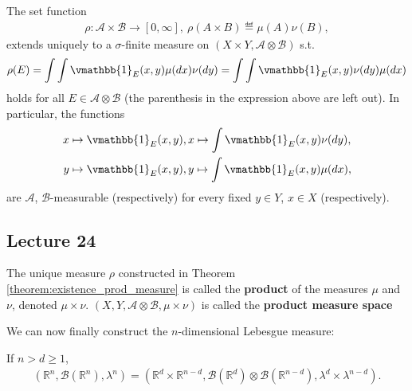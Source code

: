 \fi 
\begin{theorem}  \label{theorem:existence_prod_measure}
    The set function
    \begin{align*}
        \rho:\mathscr{A}\times \mathscr{B} \rightarrow [0,\infty], \ \rho(A\times B) \eqdef \mu(A)\nu(B),
    \end{align*}
    extends uniquely to a \(\sigma\)-finite measure on \((X\times Y, \mathscr{A}\otimes\mathscr{B})\) s.t.
    \begin{align*}
        \rho(E) = \int\int \vmathbb{1}_{E}(x,y) \mu(dx)\nu(dy) = \int\int \vmathbb{1}_{E}(x,y)\nu(dy)\mu(dx)
    \end{align*}
    holds for all \(E\in\mathscr{A}\otimes\mathscr{B}\) (the parenthesis in the expression above are left out). In particular, the functions
    \begin{align*}
        x\mapsto \vmathbb{1}_{E}(x,y)&, x\mapsto\int\vmathbb{1}_{E}(x,y)\nu(dy), \\
        y\mapsto \vmathbb{1}_{E}(x,y)&, y\mapsto\int\vmathbb{1}_{E}(x,y)\mu(dx),
    \end{align*}
    are \(\mathscr{A}\), \(\mathscr{B}\)-measurable (respectively) for every fixed \(y\in Y\), \(x\in X\) (respectively).
\end{theorem}

\subsection*{Lecture 24}
\setcounter{section}{24}
\setcounter{theorem}{24}
\begin{definition}
    The unique measure \(\rho\) constructed in Theorem \ref{theorem:existence_prod_measure} is called the \textbf{product} of the measures \(\mu\) and \(\nu\), denoted \(\mu\times\nu\). \((X,Y,\mathscr{A}\otimes \mathscr{B}, \mu\times\nu)\) is called the \textbf{product measure space}
\end{definition}
We can now finally construct the \(n\)-dimensional Lebesgue measure:
\begin{corollary}
    If \(n>d\geq 1\),
    \begin{align*}
        (\mathbb{R}^n, \mathscr{B}(\mathbb{R}^n), \lambda^n) = \left(\mathbb{R}^d\times\mathbb{R}^{n-d}, \mathscr{B}(\mathbb{R}^d)\otimes \mathscr{B}(\mathbb{R}^{n-d}), \lambda^d\times\lambda^{n-d}\right).
    \end{align*}
\end{corollary}

